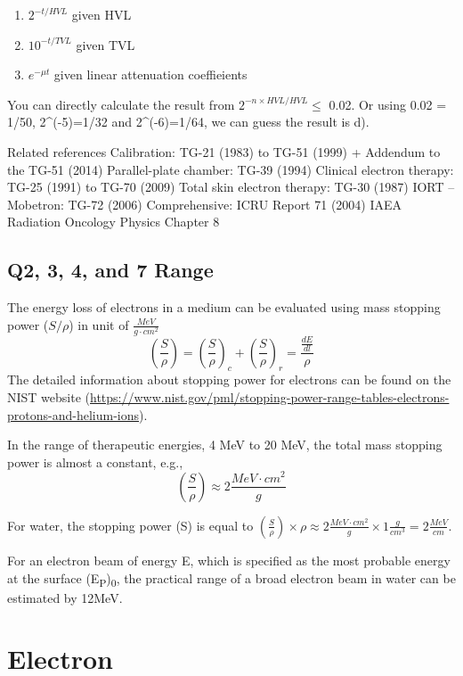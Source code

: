 \documentclass[]{book}
\providecommand{\tightlist}{%
  \setlength{\itemsep}{0pt}\setlength{\parskip}{0pt}}
\theoremstyle{definition}
\theoremstyle{definition}
\theoremstyle{definition}
\theoremstyle{remark}
\begin{document}
\begin{enumerate}
\def\labelenumi{\arabic{enumi}.}
\tightlist
\item
  \(2^{-t/HVL}\) given HVL
\item
  \(10^{-t/TVL}\) given TVL
\item
  \(e^{-\mu t}\) given linear attenuation coeffieients
\end{enumerate}

You can directly calculate the result from \(2^{-n\times HVL/HVL} \leq\)
0.02. Or using 0.02 = 1/50, 2\^{}(-5)=1/32 and 2\^{}(-6)=1/64, we can
guess the result is d).

Related references Calibration: TG-21 (1983) to TG-51 (1999) + Addendum
to the TG-51 (2014) Parallel-plate chamber: TG-39 (1994) Clinical
electron therapy: TG-25 (1991) to TG-70 (2009) Total skin electron
therapy: TG-30 (1987) IORT -- Mobetron: TG-72 (2006) Comprehensive: ICRU
Report 71 (2004) IAEA Radiation Oncology Physics Chapter 8

\section{Q2, 3, 4, and 7 Range}\label{q2-3-4-and-7-range}

The energy loss of electrons in a medium can be evaluated using mass
stopping power (\(S/\rho\)) in unit of \(\frac{MeV}{g\cdot cm^2}\)
\[ \left(\frac{S}{\rho}\right) =\left(\frac{S}{\rho} \right)_c +\left(\frac{S}{\rho} \right)_r=\frac{\frac{dE}{dl}} {\rho}\]
The detailed information about stopping power for electrons can be found
on the NIST website
(\url{https://www.nist.gov/pml/stopping-power-range-tables-electrons-protons-and-helium-ions}).

In the range of therapeutic energies, 4 MeV to 20 MeV, the total mass
stopping power is almost a constant, e.g.,
\[\left(\frac{S}{\rho}\right) \approx 2 \frac{MeV\cdot {cm}^2}{g}\]

For water, the stopping power (S) is equal to
\(\left(\frac{S}{\rho}\right) \times \rho \approx 2 \frac{MeV\cdot {cm}^2}{g}\times 1 \frac{g}{cm^3} = 2 \frac{MeV}{cm}\).

For an electron beam of energy E, which is specified as the most
probable energy at the surface (E\textsubscript{P})\textsubscript{0},
the practical range of a broad electron beam in water can be estimated
by 12MeV.

\chapter{Electron}\label{electron}
\end{document}
